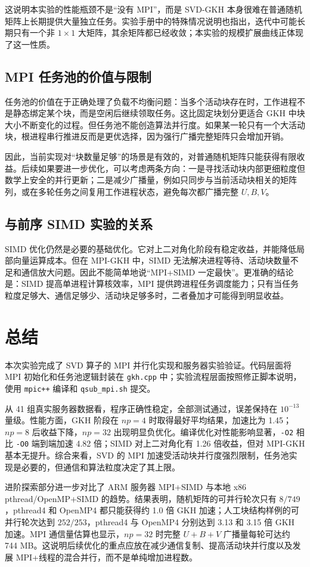 \documentclass[UTF8,a4paper,10pt,fontset=windows]{ctexart}
\begin{document}
这说明本实验的性能瓶颈不是“没有 MPI”，而是 SVD-GKH 本身很难在普通随机矩阵上长期提供大量独立任务。实验手册中的特殊情况说明也指出，迭代中可能长期只有一个非 $1\times1$ 大矩阵，其余矩阵都已经收敛；本实验的规模扩展曲线正体现了这一性质。

\subsection{MPI 任务池的价值与限制}
任务池的价值在于正确处理了负载不均衡问题：当多个活动块存在时，工作进程不是静态绑定某个块，而是空闲后继续领取任务。这比固定块划分更适合 GKH 中块大小不断变化的过程。但任务池不能创造算法并行度。如果某一轮只有一个大活动块，根进程串行推进反而是更优选择，因为强行广播完整矩阵只会增加开销。

因此，当前实现对“块数量足够”的场景是有效的，对普通随机矩阵只能获得有限收益。后续如果要进一步优化，可以考虑两条方向：一是寻找活动块内部更细粒度但数学上安全的并行更新；二是减少广播量，例如只同步与当前活动块相关的矩阵列，或在多轮任务之间复用工作进程状态，避免每次都广播完整 $U,B,V$。

\subsection{与前序 SIMD 实验的关系}
SIMD 优化仍然是必要的基础优化。它对上二对角化阶段有稳定收益，并能降低局部向量运算成本。但在 MPI-GKH 中，SIMD 无法解决进程等待、活动块数量不足和通信放大问题。因此不能简单地说“MPI+SIMD 一定最快”。更准确的结论是：SIMD 提高单进程计算核效率，MPI 提供跨进程任务调度能力；只有当任务粒度足够大、通信足够少、活动块足够多时，二者叠加才可能得到明显收益。

\section{总结}
本次实验完成了 SVD 算子的 MPI 并行化实现和服务器实验验证。代码层面将 MPI 初始化和任务池逻辑封装在 \texttt{gkh.cpp} 中；实验流程层面按照修正脚本说明，使用 \texttt{mpic++} 编译和 \texttt{qsub\_mpi.sh} 提交。

从 41 组真实服务器数据看，程序正确性稳定，全部测试通过，误差保持在 $10^{-13}$ 量级。性能方面，GKH 阶段在 $np=4$ 时取得最好平均结果，加速比为 1.45；$np=8$ 后收益下降，$np=32$ 出现明显负优化。编译优化对性能影响显著，\texttt{-O2} 相比 \texttt{-O0} 端到端加速 4.82 倍；SIMD 对上二对角化有 1.26 倍收益，但对 MPI-GKH 基本无提升。综合来看，SVD 的 MPI 加速受活动块并行度强烈限制，任务池实现是必要的，但通信和算法粒度决定了其上限。

进阶探索部分进一步对比了 ARM 服务器 MPI+SIMD 与本地 x86 pthread/OpenMP+SIMD 的趋势。结果表明，随机矩阵的可并行轮次只有 $8/749$，pthread4 和 OpenMP4 都只能获得约 1.0 倍 GKH 加速；人工块结构样例的可并行轮次达到 $252/253$，pthread4 与 OpenMP4 分别达到 3.13 和 3.15 倍 GKH 加速。MPI 通信量估算也显示，$np=32$ 时完整 $U+B+V$ 广播量每轮可达约 744 MB。这说明后续优化的重点应放在减少通信复制、提高活动块并行度以及发展 MPI+线程的混合并行，而不是单纯增加进程数。
\end{document}

